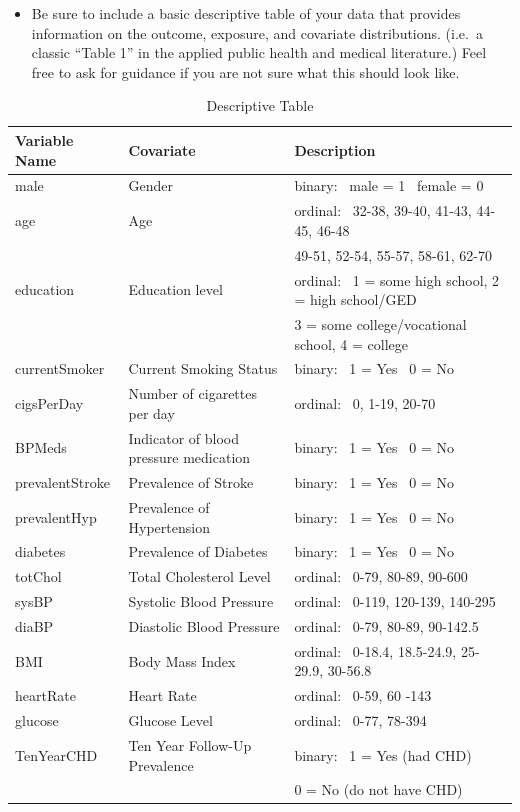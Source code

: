 \documentclass[]{article}
\providecommand{\tightlist}{%
  \setlength{\itemsep}{0pt}\setlength{\parskip}{0pt}}
\begin{document}
\begin{itemize}
\tightlist
\item
  Be sure to include a basic descriptive table of your data that
  provides information on the outcome, exposure, and covariate
  distributions. (i.e.~a classic ``Table 1'' in the applied public
  health and medical literature.) Feel free to ask for guidance if you
  are not sure what this should look like.
\end{itemize}

\begin{table}[ht]
\centering
\caption{Descriptive Table}
\begin{tabular}{|l|l|l|}
\hline
Variable Name & Covariate & Description \\ \hline
male & Gender & binary: \ male = 1 \ female = 0 \\ \hline
age & Age & ordinal: \ 32-38, 39-40, 41-43, 44-45, 46-48 \\
& & 49-51, 52-54, 55-57, 58-61, 62-70 \\ \hline
education & Education level & ordinal: \ 1 = some high school, 2 = high school/GED \\
& & 3 = some college/vocational school, 4 = college \\ \hline
currentSmoker & Current Smoking Status & binary: \ 1 = Yes \ 0 = No \\ \hline
cigsPerDay & Number of cigarettes per day & ordinal: \ 0, 1-19, 20-70 \\ \hline
BPMeds & Indicator of blood pressure medication & binary: \ 1 = Yes \  0 = No \\ \hline
prevalentStroke & Prevalence of Stroke & binary: \ 1 = Yes \ 0 = No \\ \hline
prevalentHyp & Prevalence of Hypertension & binary: \ 1 = Yes \ 0 = No \\ \hline
diabetes & Prevalence of Diabetes & binary: \ 1 = Yes \ 0 = No \\ \hline
totChol & Total Cholesterol Level & ordinal: \ 0-79, 80-89, 90-600 \\ \hline
sysBP & Systolic Blood Pressure & ordinal: \ 0-119, 120-139, 140-295 \\ \hline
diaBP & Diastolic Blood Pressure & ordinal: \ 0-79, 80-89, 90-142.5  \\ \hline
BMI & Body Mass Index & ordinal: \ 0-18.4, 18.5-24.9, 25-29.9, 30-56.8 \\ \hline
heartRate & Heart Rate & ordinal: \ 0-59, 60 -143 \\ \hline
glucose & Glucose Level & ordinal: \ 0-77, 78-394 \\ \hline
TenYearCHD & Ten Year Follow-Up Prevalence & binary: \ 1 = Yes (had CHD) \\
& & 0 = No (do not have CHD) \\ \hline
\end{tabular}
\end{table}
\end{document}
